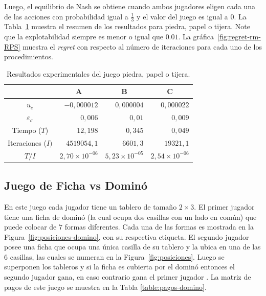Luego, el equilibrio de Nash se obtiene cuando ambos jugadores eligen cada una de las acciones con probabilidad igual a $\frac{1}{3}$ y el valor del juego es igual a $0$. La Tabla~\ref{table:resultados-rm-RPS} muestra el resumen de los resultados para piedra, papel o tijera. Note que la explotabilidad siempre es menor o igual que $0.01$. La gráfica~\ref{fig:regret-rm-RPS} muestra el \textit{regret} con respecto al número de iteraciones para cada uno de los procedimientos.

\begin{table}[h]
\caption{Resultados experimentales del juego piedra, papel o tijera.}
\label{table:resultados-rm-RPS}
\centering
\begin{tabular}{c r r r}
    \toprule
    & \multicolumn{1}{c}{A} & \multicolumn{1}{c}{B} & \multicolumn{1}{c}{C} \\ \midrule
    $u_e$ & $-0,000012$ & $0,000004$ & $0,000022$ \\
    $\varepsilon_{\sigma}$ & $0,006$ & $0,01$ & $0,009$ \\
    Tiempo ($T$) & $12,198$ & $0,345$ & $0,049$ \\
    Iteraciones ($I) $ & $4519054,1$ & $6601,3$ &  $19321,1$ \\
    $T/I$ & $2,70 {\times} 10^{-06}$ & $5,23 {\times} 10^{-05}$ & $2,54 {\times} 10^{-06}$\\
    \bottomrule
\end{tabular}
\end{table}


\subsection*{Juego de Ficha vs Dominó}

En este juego cada jugador tiene un tablero de tamaño $2\times 3$. El primer jugador tiene una ficha de dominó (la cual ocupa dos casillas con un lado en común) que puede colocar de $7$ formas diferentes. Cada una de las formas es mostrada en la Figura~\ref{fig:posiciones-domino}, con su respectiva etiqueta. El segundo jugador posee una ficha que ocupa una única casilla de su tablero y la ubica en una de las $6$ casillas, las cuales se numeran en la Figura~\ref{fig:posiciones}. Luego se superponen los tableros y si la ficha es cubierta por el dominó entonces el segundo jugador gana, en caso contrario gana el primer jugador \cite[p. 237]{bib:pl-chvatal}. La matriz de pagos de este juego se muestra en la Tabla \ref{table:pagos-domino}.

